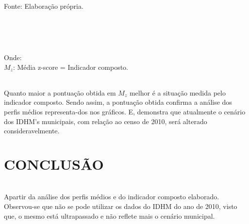 \documentclass[a4paper, 10pt]{article}
\begin{document}
\begin{table}[H]
    \centering
	     \caption{\centering Classificação dos municípios de acordo com o indicador composto.}
	\\ 
	Fonte: Elaboração própria.

	\\
	  \label{tab:my_label}
	\end{table}
\\
\\
\noindent
Onde:
\\
 $M{_z}$: Média z-score = Indicador composto.

\\

Quanto maior a pontuação obtida em $M{_z}$ melhor é a situação medida pelo indicador composto. Sendo assim, a pontuação obtida confirma a análise dos perfis médios representa-dos nos gráficos. E, demonstra que atualmente o cenário dos IDHM's municipais, com relação ao censo de 2010, será alterado consideravelmente. 
\newpage
\large
\section{CONCLUSÃO}
\\
 Apartir da análise dos perfis médios e do indicador composto elaborado. Observou-se que não se pode utilizar os dados do IDHM do ano de 2010, visto que, o mesmo está ultrapassado e não reflete mais o cenário municipal.
 
 \\
 
\end{document}
